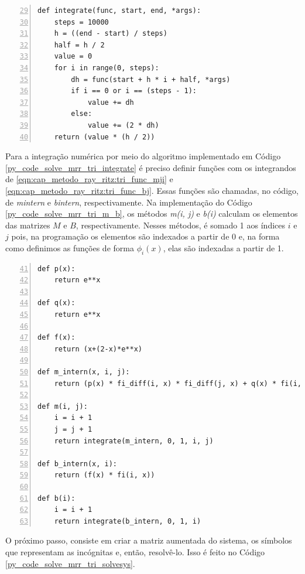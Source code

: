 \documentclass[
	12pt,				%
	openright,			%
    twoside,			%
	a4paper,			%
	english,			%
	french,				%
	spanish,			%
	brazil				%
	]{abntex2}
\numberwithin{lema}{chapter}
\numberwithin{teorema}{chapter}
\numberwithin{definicao}{chapter}
\numberwithin{exemplo}{chapter}
\numberwithin{figure}{chapter}
\begin{document}
\begin{lstlisting}[style=Python, xleftmargin=2em, numbers=left, firstnumber=29, caption={Algoritmo para integração numérica usando a regra dos trapézios}, captionpos=t, label=py_code_solve_mrr_tri_integrate]
def integrate(func, start, end, *args):
    steps = 10000
    h = ((end - start) / steps)
    half = h / 2
    value = 0
    for i in range(0, steps):
        dh = func(start + h * i + half, *args)
        if i == 0 or i == (steps - 1):
            value += dh
        else:
            value += (2 * dh)
    return (value * (h / 2))
\end{lstlisting}

Para a integração numérica por meio do algoritmo implementado em Código \ref{py_code_solve_mrr_tri_integrate} é preciso definir funções com os integrandos de \eqref{eqn:cap_metodo_ray_ritz:tri_func_mji} e \eqref{eqn:cap_metodo_ray_ritz:tri_func_bj}. Essas funções são chamadas, no código, de \textit{m\underline{\hspace{.1in}}intern} e \textit{b\underline{\hspace{0.1in}}intern}, respectivamente. Na implementação do Código \ref{py_code_solve_mrr_tri_m_b}, os métodos \textit{m(i, j)} e \textit{b(i)} calculam os elementos das matrizes $M$ e $B$, respectivamente. Nesses métodos, é somado 1 aos índices $i$ e $j$ pois, na programação os elementos são indexados a partir de 0 e, na forma como definimos as funções de forma $\phi_i(x)$, elas são indexadas a partir de 1.

\begin{lstlisting}[style=Python, xleftmargin=2em, numbers=left, firstnumber=41, caption={Funções utilizadas para criação das matrizes do sistema linear}, captionpos=t, label=py_code_solve_mrr_tri_m_b]
def p(x):
    return e**x

def q(x):
    return e**x

def f(x):
    return (x+(2-x)*e**x)

def m_intern(x, i, j):
    return (p(x) * fi_diff(i, x) * fi_diff(j, x) + q(x) * fi(i, x) * fi(j, x))

def m(i, j):
    i = i + 1
    j = j + 1
    return integrate(m_intern, 0, 1, i, j)

def b_intern(x, i):
    return (f(x) * fi(i, x))

def b(i):
    i = i + 1
    return integrate(b_intern, 0, 1, i)
\end{lstlisting}

O próximo passo, consiste em criar a matriz aumentada do sistema, os símbolos que representam as incógnitas e, então, resolvê-lo. Isso é feito no Código \ref{py_code_solve_mrr_tri_solvesys}.
\end{document}
